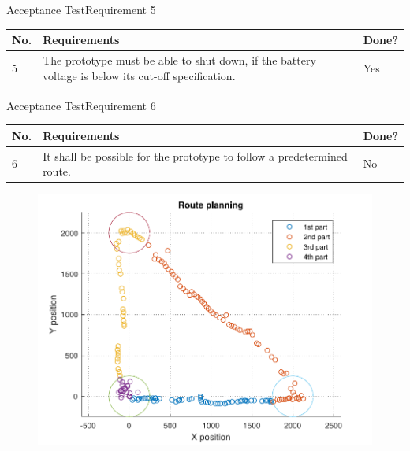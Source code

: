 

\begin{frame}{Acceptance Test}{Requirement 5}

\begin{table}[H] \centering
\begin{tabular}{|p{0.5cm}| p{7cm} |p{1cm}|}
\hline
\textbf{No.}  &  \textbf{Requirements} & \textbf{Done?}     \\ 
\hline
5 & The prototype must be able to shut down, if the battery voltage is below its 
cut-off specification. & Yes \\ 
\hline
\end{tabular}
\end{table}
\end{frame}



\begin{frame}{Acceptance Test}{Requirement 6}

\begin{table}[H] \centering
\begin{tabular}{|p{0.5cm}| p{7cm} |p{1cm}|}
\hline
\textbf{No.}  &  \textbf{Requirements} & \textbf{Done?}     \\ 
\hline
6 & It shall be possible for the prototype to follow a predetermined route.  & No \\ \hline
\end{tabular}
\end{table}

  \pause

\begin{figure}[H]
  \centering
	\includegraphics[scale=0.5]{Pictures/AccTest6.pdf}
\end{figure}
\end{frame}


